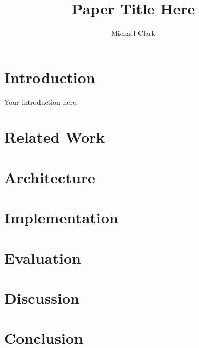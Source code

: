 \documentclass[man,12pt,floatsintext]{apa7}
\title{Paper Title Here}
\author{Michael Clark}
\affiliation{Independent Researcher \\ scipraxian}
\begin{document}
\maketitle

\section{Introduction}

Your introduction here.

\section{Related Work}

\section{Architecture}

\section{Implementation}

\section{Evaluation}

\section{Discussion}

\section{Conclusion}

\printbibliography
\end{document}
